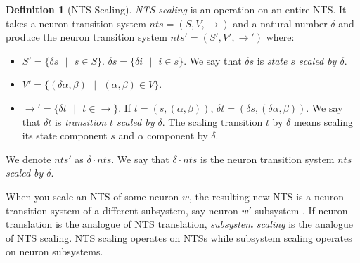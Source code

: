 \documentclass[]{elsarticle}
\theoremstyle{definition}
\newtheorem{definition2}{Definition}
\theoremstyle{definition}
\newcommand{\ra}{\rightarrow}
\newcommand{\se}{\text{ }}
\begin{document}

\begin{definition2}[NTS Scaling]
\emph{NTS scaling} is an operation on an entire NTS. It takes a neuron transition system $nts=
(S,V,\ra)$ and a natural number $\delta$ and produce the neuron transition system $nts'=(S',V',\ra')$
where:
\begin{itemize}
   \item $S'=\{\delta s\se|\se s \in S\}$. $\delta s = \{\delta i\se|\se i\in s\}$.
         We say that $\delta s$ is \emph{state $s$ scaled by $\delta$}.
   \item $V'=\{(\delta \alpha,\beta)\se|\se (\alpha,\beta)\in V\}$.
   \item $\ra'=\{\delta t \se|\se t\in \ra \}$. If $t=(s, (\alpha,\beta))$, $\delta t=(\delta s,
         (\delta \alpha,\beta))$. We say that $\delta t$ is \emph{transition $t$ scaled by 
         $\delta$}. The scaling transition $t$ by $\delta$ means scaling its state component $s$ and
         $\alpha$ component by $\delta$.
\end{itemize}
We denote $nts'$ as $\delta\cdot nts$. We say that $\delta\cdot nts$ is the neuron transition system 
$nts$ \emph{scaled by $\delta$}.
\end{definition2}


When you scale an NTS of some neuron $w$, the resulting new NTS is a neuron transition system 
of a different subsystem, say neuron $w'$ subsystem . If neuron translation is the analogue of NTS 
translation, \emph{subsystem scaling} is the analogue of NTS scaling. NTS scaling operates on NTSs 
while subsystem scaling operates on neuron subsystems.

\end{document}
